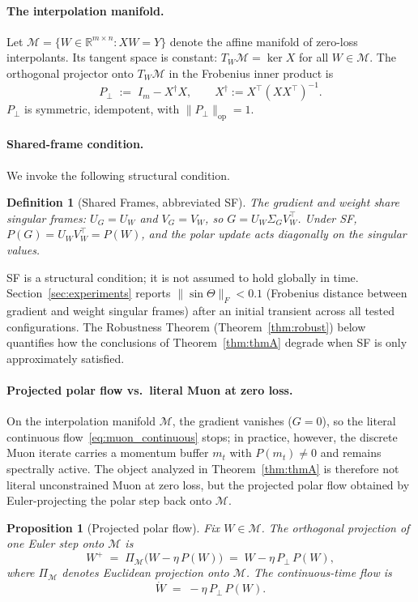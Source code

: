 \documentclass{article}
\newtheorem{proposition}{Proposition}
\newtheorem{definition}{Definition}
\begin{document}
\paragraph{The interpolation manifold.}
Let $\mathcal{M}=\{W\in\mathbb{R}^{m\times n}:XW=Y\}$ denote the affine manifold of zero-loss interpolants. Its tangent space is constant: $T_W\mathcal{M}=\ker X$ for all $W\in\mathcal{M}$. The orthogonal projector onto $T_W\mathcal{M}$ in the Frobenius inner product is
\[
P_\perp \;:=\; I_m - X^\dagger X, \qquad X^\dagger := X^\top(XX^\top)^{-1}.
\]
$P_\perp$ is symmetric, idempotent, with $\|P_\perp\|_{\mathrm{op}}=1$.

\paragraph{Shared-frame condition.}
We invoke the following structural condition.

\begin{definition}[Shared Frames, abbreviated \textsf{SF}]
\label{def:sf}
The gradient and weight share singular frames: $U_G=U_W$ and $V_G=V_W$, so $G=U_W\Sigma_G V_W^\top$. Under \textsf{SF}, $P(G)=U_W V_W^\top = P(W)$, and the polar update acts diagonally on the singular values.
\end{definition}

\textsf{SF} is a structural condition; it is not assumed to hold globally in time. Section~\ref{sec:experiments} reports $\|\sin\Theta\|_F<0.1$ (Frobenius distance between gradient and weight singular frames) after an initial transient across all tested configurations. The Robustness Theorem (Theorem~\ref{thm:robust}) below quantifies how the conclusions of Theorem~\ref{thm:thmA} degrade when \textsf{SF} is only approximately satisfied.

\paragraph{Projected polar flow vs.\ literal Muon at zero loss.}
On the interpolation manifold $\mathcal M$, the gradient vanishes ($G=0$), so the literal continuous flow~\eqref{eq:muon_continuous} stops; in practice, however, the discrete Muon iterate carries a momentum buffer $m_t$ with $P(m_t)\ne 0$ and remains spectrally active. The object analyzed in Theorem~\ref{thm:thmA} is therefore not literal unconstrained Muon at zero loss, but the projected polar flow obtained by Euler-projecting the polar step back onto $\mathcal M$.

\begin{proposition}[Projected polar flow]
\label{prop:proj_flow}
Fix $W\in\mathcal M$. The orthogonal projection of one Euler step onto $\mathcal M$ is
\begin{equation}
W^+ \;=\; \Pi_{\mathcal M}\!\bigl(W-\eta\,P(W)\bigr) \;=\; W - \eta\,P_\perp\,P(W),
\label{eq:proj_step}
\end{equation}
where $\Pi_{\mathcal M}$ denotes Euclidean projection onto $\mathcal M$. The continuous-time flow is
\begin{equation}
\dot W \;=\; -\eta\,P_\perp\,P(W).
\label{eq:proj_flow}
\end{equation}
\end{proposition}
\end{document}
